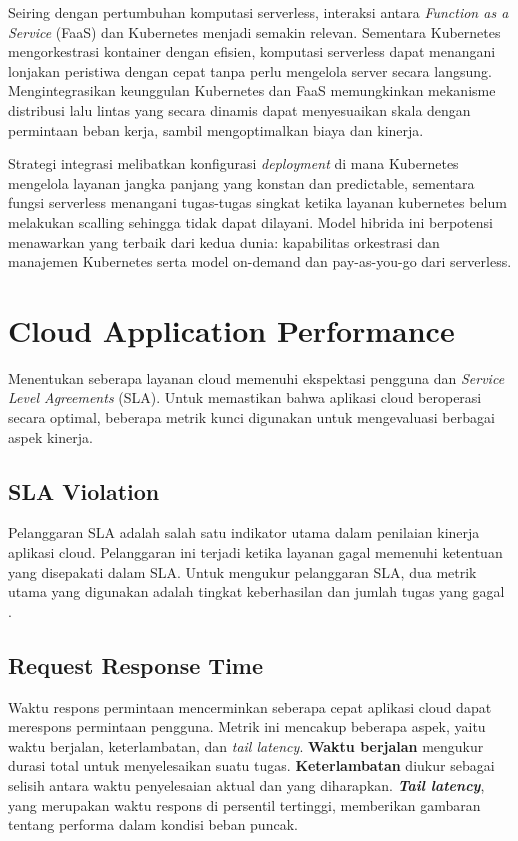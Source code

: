 Seiring dengan pertumbuhan komputasi serverless, interaksi antara \emph{Function as a Service} (FaaS) dan Kubernetes menjadi semakin relevan. Sementara Kubernetes mengorkestrasi kontainer dengan efisien, komputasi serverless dapat menangani lonjakan peristiwa dengan cepat tanpa perlu mengelola server secara langsung. Mengintegrasikan keunggulan Kubernetes dan FaaS memungkinkan mekanisme distribusi lalu lintas yang secara dinamis dapat menyesuaikan skala dengan permintaan beban kerja, sambil mengoptimalkan biaya dan kinerja.

Strategi integrasi melibatkan konfigurasi \emph{deployment} di mana Kubernetes mengelola layanan jangka panjang yang konstan dan predictable, sementara fungsi serverless menangani tugas-tugas singkat ketika layanan kubernetes belum melakukan scalling sehingga tidak dapat dilayani. Model hibrida ini berpotensi menawarkan yang terbaik dari kedua dunia: kapabilitas orkestrasi dan manajemen Kubernetes serta model on-demand dan pay-as-you-go dari serverless.

\section{Cloud Application Performance}
\label{sec:cloud-performance}

Menentukan seberapa layanan cloud memenuhi ekspektasi pengguna dan \emph{Service Level Agreements} (SLA). Untuk memastikan bahwa aplikasi cloud beroperasi secara optimal, beberapa metrik kunci digunakan untuk mengevaluasi berbagai aspek kinerja.

\subsection{SLA Violation}

Pelanggaran SLA adalah salah satu indikator utama dalam penilaian kinerja aplikasi cloud. Pelanggaran ini terjadi ketika layanan gagal memenuhi ketentuan yang disepakati dalam SLA. Untuk mengukur pelanggaran SLA, dua metrik utama yang digunakan adalah tingkat keberhasilan dan jumlah tugas yang gagal \citep{aslanpour2020performance}.

\subsection{Request Response Time}

Waktu respons permintaan mencerminkan seberapa cepat aplikasi cloud dapat merespons permintaan pengguna. Metrik ini mencakup beberapa aspek, yaitu waktu berjalan, keterlambatan, dan \emph{tail latency}. \textbf{Waktu berjalan} mengukur durasi total untuk menyelesaikan suatu tugas. \textbf{Keterlambatan} diukur sebagai selisih antara waktu penyelesaian aktual dan yang diharapkan. \emph{\textbf{Tail latency}}, yang merupakan waktu respons di persentil tertinggi, memberikan gambaran tentang performa dalam kondisi beban puncak.

